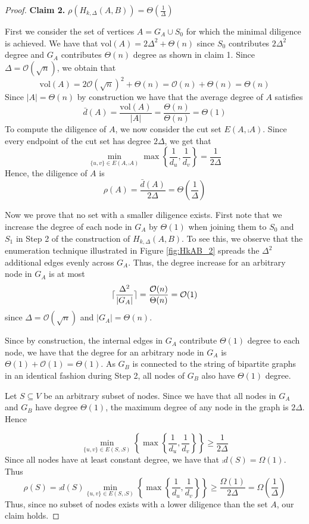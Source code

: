 \begin{proof}

	\textbf{Claim 2.} $\rho(H_{k, \Delta}(A,B)) = \Theta\left(\frac{1}{\Delta}\right)$

	First we consider the set of vertices $A = G_A \cup S_0$ for which the minimal diligence is achieved. %
	We have that $\text{vol}(A) = 2\Delta^2 + \Theta(n)$ since $S_0$ contributes $2\Delta^2$ degree and $G_A$ contributes $\Theta(n)$ degree as shown in claim 1. Since $\Delta = \mathcal{O}(\sqrt{n})$, we obtain that 
	$$
		\text{vol}(A) = 2 \mathcal{O}(\sqrt{n})^2 + \Theta(n) = \mathcal{O}(n) + \Theta(n) = \Theta(n)
	$$ %
	Since $|A| = \Theta(n)$ by construction we have that the average degree of $A$ satisfies $$
		\bar{d}(A) = \frac{\text{vol}(A)}{|A|} = \frac{\Theta(n)}{\Theta(n)} = \Theta(1)
	$$
	To compute the diligence of $A$, we now consider the cut set $E(A, \comp{A})$. Since every endpoint of the cut set has degree $2\Delta$, we get that 
	$$
		\min_{\{u, v\} \in E(A, \comp{A})} \max \left\{ \frac{1}{d_u}, \frac{1}{d_v} \right\} = \frac{1}{2\Delta}
	$$
	Hence, the diligence of $A$ is 
	$$
		\rho(A) = \frac{\bar{d}(A)}{2\Delta} = \Theta\left(\frac{1}{\Delta}\right)
	$$ 
	
	Now we prove that no set with a smaller diligence exists. First note that we increase the degree of each node in $G_A$ by $\Theta(1)$ when joining them to $S_0$ and $S_1$ in Step 2 of the construction of $H_{k, \Delta}(A,B)$. To see this, we observe that the enumeration technique illustrated in Figure \ref{fig:HkAB_2} spreads the $\Delta^2$ additional edges evenly across $G_A$. Thus, the degree increase for an arbitrary node in $G_A$ is at most
	$$
		\lceil\frac{\Delta^2}{|G_A|}\rceil=\frac{\mathcal{O}(n)}{\Theta(n)} = \mathcal{O}(1)
	$$
	since $\Delta = \mathcal{O}(\sqrt{n})$ and $|G_A| = \Theta(n)$. 
	
	Since by construction, the internal edges in $G_A$ contribute $\Theta(1)$ degree to each node, we have that the degree for an arbitrary node in $G_A$ is $\Theta(1) + \mathcal{O}(1) = \Theta(1)$. As $G_B$ is connected to the string of bipartite graphs in an identical fashion during Step 2, all nodes of $G_B$ also have $\Theta(1)$ degree.  
	
	Let $S \subseteq V$ be an arbitrary subset of nodes. Since we have that all nodes in $G_A$ and $G_B$ have degree $\Theta(1)$, the maximum degree of any node in the graph is $2\Delta$. Hence 

	$$
	\min_{\{u, v\} \in E(S, \comp{S}) } \left\{ \max \left\{ \frac{1}{d_u},\frac{1}{d_v} \right\} \right\} \geq \frac{1}{2\Delta}
	$$
	Since all nodes have at least constant degree, we have that $\comp{d}(S) = \Omega(1)$. Thus 
	$$
		\rho(S) 
		= \comp{d}(S) \min_{\{u, v\} \in E(S, \comp{S}) } \left\{ \max \left\{ \frac{1}{d_u},\frac{1}{d_v} \right\} \right\}
		\geq \frac{\Omega(1)}{2\Delta}
		= \Omega\left(\frac{1}{\Delta}\right)
	$$
	Thus, since no subset of nodes exists with a lower diligence than the set $A$, our claim holds.


\end{proof}
